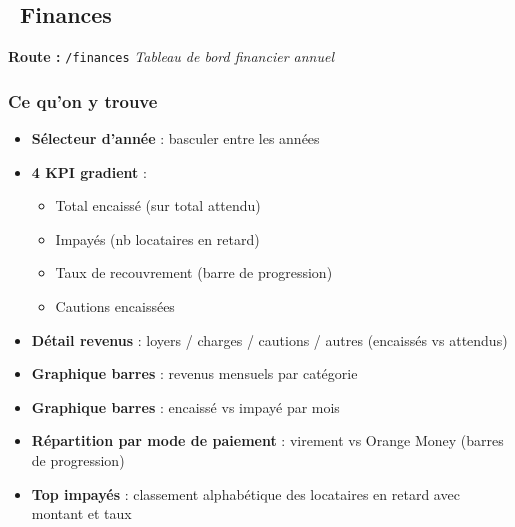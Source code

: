 \documentclass[12pt,a4paper]{article}
\begin{document}
\subsection{\faChartLine\ Finances}
\textbf{Route :} \texttt{/finances} \hfill \textit{Tableau de bord financier annuel}

\subsubsection{Ce qu'on y trouve}
\begin{itemize}
\item \textbf{S\'electeur d'ann\'ee} : basculer entre les ann\'ees
\item \textbf{4 KPI gradient} :
  \begin{itemize}
  \item Total encaiss\'e (sur total attendu)
  \item Impay\'es (nb locataires en retard)
  \item Taux de recouvrement (barre de progression)
  \item Cautions encaiss\'ees
  \end{itemize}
\item \textbf{D\'etail revenus} : loyers / charges / cautions / autres (encaiss\'es vs attendus)
\item \textbf{Graphique barres} : revenus mensuels par cat\'egorie
\item \textbf{Graphique barres} : encaiss\'e vs impay\'e par mois
\item \textbf{R\'epartition par mode de paiement} : virement vs Orange Money (barres de progression)
\item \textbf{Top impay\'es} : classement alphab\'etique des locataires en retard avec montant et taux
\end{itemize}
\end{document}
